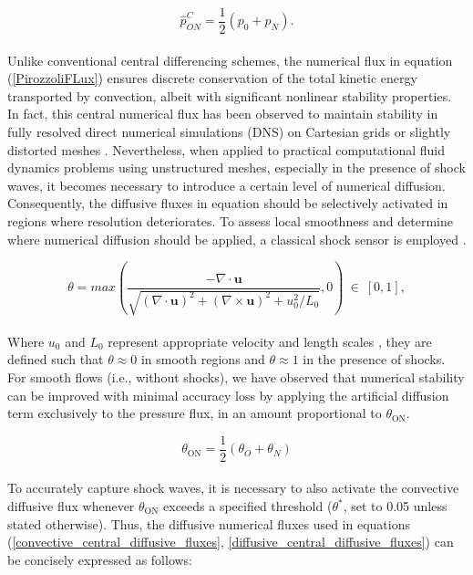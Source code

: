 \documentclass[a5paper]{sapthesis}
\begin{document}
	\begin{equation}
		\hat{p}^{C}_{ON} = \frac{1}{2} (p_0 + p_N).
	\end{equation}
	\\
	Unlike conventional central differencing schemes, the numerical flux in equation (\ref{PirozzoliFLux}) ensures discrete conservation of the total kinetic energy transported by convection, albeit with significant nonlinear stability properties. In fact, this central numerical flux has been observed to maintain stability in fully resolved direct numerical simulations (DNS) on Cartesian grids or slightly distorted meshes \cite{PIROZZOLI20107180,PIROZZOLI20112997}. Nevertheless, when applied to practical computational fluid dynamics problems using unstructured meshes, especially in the presence of shock waves, it becomes necessary to introduce a certain level of numerical diffusion. Consequently, the diffusive fluxes in equation should be selectively activated in regions where resolution deteriorates. To assess local smoothness and determine where numerical diffusion should be applied, a classical shock sensor is employed \cite{DUCROS1999}.
	
	\begin{equation}
		\theta = max\left (\dfrac{-\nabla \cdot \mathbf{u}}{\sqrt{(\nabla \cdot \mathbf{u})^2 + (\nabla \times \mathbf{u})^2 + u_0^2/L_0}}, 0 \right ) \ \in \ [0,1],
	\end{equation}
	\\
	Where $u_0$ and $L_0$ represent appropriate velocity and length scales \cite{Pirozzoli2011}, they are defined such that $ \theta \approx 0 $ in smooth regions and $ \theta \approx 1 $ in the presence of shocks.  
	\\
	For smooth flows (i.e., without shocks), we have observed that numerical stability can be improved with minimal accuracy loss by applying the artificial diffusion term exclusively to the pressure flux, in an amount proportional to $ \theta_{\text{ON}} $. 
	
	\begin{equation}
		\theta_{\text{ON}} = \frac{1}{2} (\theta_O +\theta_N)
	\end{equation}
	\\
	To accurately capture shock waves, it is necessary to also activate the convective diffusive flux whenever $ \theta_{\text{ON}} $ exceeds a specified threshold ($ \theta^* $, set to 0.05 unless stated otherwise). Thus, the diffusive numerical fluxes used in equations (\ref{convective_central_diffusive_fluxes}, \ref{diffusive_central_diffusive_fluxes}) can be concisely expressed as follows:
	
\end{document}
